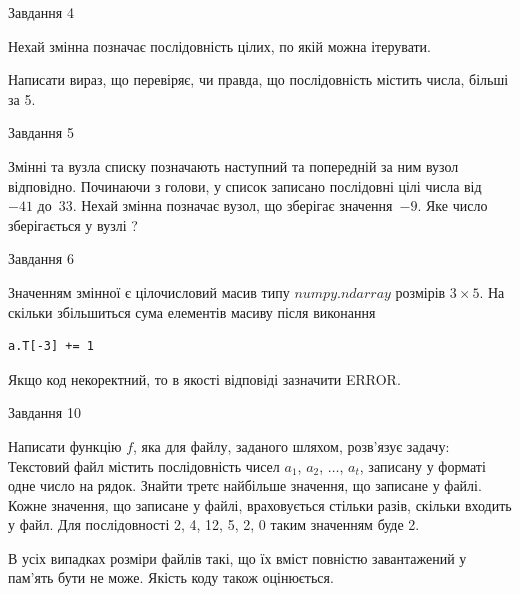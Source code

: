 \documentclass[12pt, ukrainian]{article}
\begin{document}
{               
{\begin{center}Завдання {4}\end{center}}
\vspace{-6mm}
Нехай змінна  позначає послідовність цілих, по якій можна ітерувати.

Написати вираз, що перевіряє, чи правда, що послідовність  містить числа, більші за 5.\par

\vspace{10mm}
               
{\begin{center}Завдання {5}\end{center}}
\vspace{-6mm}
Змінні  та  вузла списку позначають наступний та попередній за ним вузол відповідно. Починаючи з голови, у список записано послідовні цілі числа від~$-41$ до~$33$. Нехай змінна  позначає вузол, що зберігає значення~$-9$.
Яке число зберігається у вузлі  ?\par

               
{\begin{center}Завдання {6}\end{center}}
\vspace{-6mm}
Значенням змінної  є цілочисловий масив типу $numpy.ndarray$ розмірів $3{\times}5$. На скільки збільшиться сума елементів масиву  після виконання
\begin{verbatim}
a.T[-3] += 1
\end{verbatim}


Якщо код некоректний, то в якості відповіді зазначити ERROR.\par

               
{\begin{center}Завдання {10}\end{center}}
\vspace{-6mm}

Написати функцію $f$, яка для файлу, заданого шляхом, розв’язує задачу:\\ Текстовий файл містить послідовність чисел $a_1$, $a_2$, $\ldots$, $a_t$, записану у форматі одне число на рядок. Знайти третє найбільше значення, що записане у файлі. Кожне значення, що записане у файлі, враховується стільки разів, скільки входить у файл. Для послідовності 2, 4, 12, 5, 2, 0 таким значенням буде 2.

В усіх випадках розміри файлів такі, що їх вміст повністю завантажений у пам'ять бути не може. Якість коду також оцінюється.



}
\end{document}
